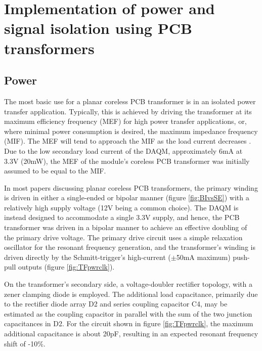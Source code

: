 \documentclass[conference]{IEEEtran}
\begin{document}
\section{Implementation of power and signal isolation using PCB transformers}

	\subsection{Power}
	The most basic use for a planar coreless PCB transformer is in an isolated power transfer application.  Typically, this is achieved by driving the transformer at its maximum efficiency frequency (MEF) for high power transfer applications, or, where minimal power consumption is desired, the maximum impedance frequency (MIF).  The MEF will tend to approach the MIF as the load current decreases \cite{TangHuiFundamental}.  Due to the low secondary load current of the DAQM, approximately 6mA at 3.3V (20mW), the MEF of the module's coreless PCB transformer was initially assumed to be equal to the MIF.
	
	In most papers discussing planar coreless PCB transformers, the primary winding is driven in either a single-ended or bipolar manner (figure \ref{fig:BIvsSE}) with a relatively high supply voltage (12V being a common choice). The DAQM is instead designed to accommodate a single 3.3V supply, and hence, the PCB transformer was driven in a bipolar manner to achieve an effective doubling of the primary drive voltage.  The primary drive circuit uses a simple relaxation oscillator for the resonant frequency generation, and the transformer's winding is driven directly by the Schmitt-trigger's high-current ($\pm$50mA maximum) push-pull outputs (figure \ref{fig:TFpwrclk}).
	
	On the transformer's secondary side, a voltage-doubler rectifier topology, with a zener clamping diode is employed. 
	The additional load capacitance, primarily due to the rectifier diode array D2 and series coupling capacitor C4, may be estimated as the coupling capacitor in parallel with the sum of the two junction capacitances in D2.  For the circuit shown in figure \ref{fig:TFpwrclk}, the maximum additional capacitance is about 20pF, resulting in an expected resonant frequency shift of -10\%.
	
\end{document}
